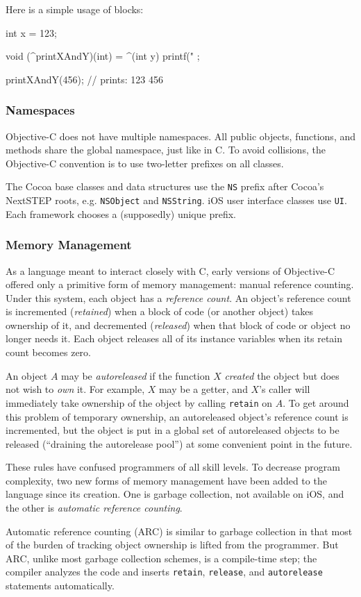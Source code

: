 Here is a simple usage of blocks:

\begin{objc}
int x = 123;
 
void (^printXAndY)(int) = ^(int y) {
    printf("%
};

printXAndY(456); // prints: 123 456
\end{objc}

\subsubsection{Namespaces}
\label{sect:objc_namespaces}

Objective-C does not have multiple namespaces. All public objects, functions,
and methods share the global namespace, just like in C. To avoid collisions, the
Objective-C convention is to use two-letter prefixes on all classes.

The Cocoa base classes and data structures use the \texttt{NS} prefix after
Cocoa's NextSTEP roots, e.g. \texttt{NSObject} and \texttt{NSString}. iOS user
interface classes use \texttt{UI}. Each framework chooses a (supposedly) unique
prefix.

\subsubsection{Memory Management}
\label{sect:objc_memory}

As a language meant to interact closely with C, early versions of Objective-C
offered only a primitive form of memory management: manual reference counting.
Under this system, each object has a \emph{reference count}. An object's
reference count is incremented (\emph{retained}) when a block of code (or
another object) takes ownership of it, and decremented (\emph{released}) when
that block of code or object no longer needs it. Each object releases all of its
instance variables when its retain count becomes zero.

An object $A$ may be \emph{autoreleased} if the function $X$ \emph{created} the
object but does not wish to \emph{own} it. For example, $X$ may be a getter, and
$X$'s caller will immediately take ownership of the object by calling
\texttt{retain} on $A$. To get around this problem of temporary ownership, an
autoreleased object's reference count is incremented, but the object is put in a
global set of autoreleased objects to be released (``draining the autorelease
pool'') at some convenient point in the future.

These rules have confused programmers of all skill levels. To decrease program
complexity, two new forms of memory management have been added to the language
since its creation. One is garbage collection, not available on iOS, and the
other is \emph{automatic reference counting}.

Automatic reference counting (ARC) is similar to garbage collection in that most
of the burden of tracking object ownership is lifted from the programmer. But
ARC, unlike most garbage collection schemes, is a compile-time step; the
compiler analyzes the code and inserts \texttt{retain}, \texttt{release}, and
\texttt{autorelease} statements automatically.
